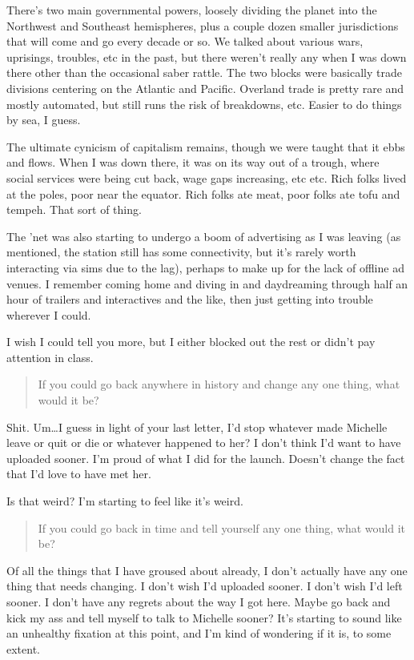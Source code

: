 There's two main governmental powers, loosely dividing the planet into the Northwest and Southeast hemispheres, plus a couple dozen smaller jurisdictions that will come and go every decade or so. We talked about various wars, uprisings, troubles, etc in the past, but there weren't really any when I was down there other than the occasional saber rattle. The two blocks were basically trade divisions centering on the Atlantic and Pacific. Overland trade is pretty rare and mostly automated, but still runs the risk of breakdowns, etc. Easier to do things by sea, I guess.

The ultimate cynicism of capitalism remains, though we were taught that it ebbs and flows. When I was down there, it was on its way out of a trough, where social services were being cut back, wage gaps increasing, etc etc. Rich folks lived at the poles, poor near the equator. Rich folks ate meat, poor folks ate tofu and tempeh. That sort of thing.

The 'net was also starting to undergo a boom of advertising as I was leaving (as mentioned, the station still has some connectivity, but it's rarely worth interacting via sims due to the lag), perhaps to make up for the lack of offline ad venues. I remember coming home and diving in and daydreaming through half an hour of trailers and interactives and the like, then just getting into trouble wherever I could.

I wish I could tell you more, but I either blocked out the rest or didn't pay attention in class.

\begin{quote}
If you could go back anywhere in history and change any one thing, what would it be?
\end{quote}

\noindent Shit. Um\ldots I guess in light of your last letter, I'd stop whatever made Michelle leave or quit or die or whatever happened to her? I don't think I'd want to have uploaded sooner. I'm proud of what I did for the launch. Doesn't change the fact that I'd love to have met her.

Is that weird? I'm starting to feel like it's weird.

\begin{quote}
If you could go back in time and tell yourself any one thing, what would it be?
\end{quote}

\noindent Of all the things that I have groused about already, I don't actually have any one thing that needs changing. I don't wish I'd uploaded sooner. I don't wish I'd left sooner. I don't have any regrets about the way I got here. Maybe go back and kick my ass and tell myself to talk to Michelle sooner? It's starting to sound like an unhealthy fixation at this point, and I'm kind of wondering if it is, to some extent.

